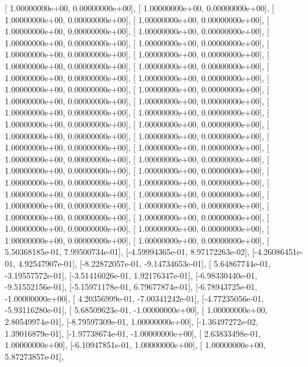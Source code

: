 \documentclass{article}
\begin{document}
       [ 1.00000000e+00,  0.00000000e+00],
       [ 1.00000000e+00,  0.00000000e+00],
       [ 1.00000000e+00,  0.00000000e+00],
       [ 1.00000000e+00,  0.00000000e+00],
       [ 1.00000000e+00,  0.00000000e+00],
       [ 1.00000000e+00,  0.00000000e+00],
       [ 1.00000000e+00,  0.00000000e+00],
       [ 1.00000000e+00,  0.00000000e+00],
       [ 1.00000000e+00,  0.00000000e+00],
       [ 1.00000000e+00,  0.00000000e+00],
       [ 1.00000000e+00,  0.00000000e+00],
       [ 1.00000000e+00,  0.00000000e+00],
       [ 1.00000000e+00,  0.00000000e+00],
       [ 1.00000000e+00,  0.00000000e+00],
       [ 1.00000000e+00,  0.00000000e+00],
       [ 1.00000000e+00,  0.00000000e+00],
       [ 1.00000000e+00,  0.00000000e+00],
       [ 1.00000000e+00,  0.00000000e+00],
       [ 1.00000000e+00,  0.00000000e+00],
       [ 1.00000000e+00,  0.00000000e+00],
       [ 1.00000000e+00,  0.00000000e+00],
       [ 1.00000000e+00,  0.00000000e+00],
       [ 1.00000000e+00,  0.00000000e+00],
       [ 1.00000000e+00,  0.00000000e+00],
       [ 1.00000000e+00,  0.00000000e+00],
       [ 1.00000000e+00,  0.00000000e+00],
       [ 1.00000000e+00,  0.00000000e+00],
       [ 1.00000000e+00,  0.00000000e+00],
       [ 1.00000000e+00,  0.00000000e+00],
       [ 1.00000000e+00,  0.00000000e+00],
       [ 1.00000000e+00,  0.00000000e+00],
       [ 1.00000000e+00,  0.00000000e+00],
       [ 1.00000000e+00,  0.00000000e+00],
       [ 1.00000000e+00,  0.00000000e+00],
       [ 1.00000000e+00,  0.00000000e+00],
       [ 1.00000000e+00,  0.00000000e+00],
       [ 1.00000000e+00,  0.00000000e+00],
       [ 1.00000000e+00,  0.00000000e+00],
       [ 1.00000000e+00,  0.00000000e+00],
       [ 1.00000000e+00,  0.00000000e+00],
       [ 1.00000000e+00,  0.00000000e+00],
       [ 1.00000000e+00,  0.00000000e+00],
       [ 5.50368185e-01,  7.99500734e-01],
       [-4.59994365e-01,  8.97172263e-02],
       [-4.26086451e-01,  4.92547907e-01],
       [-8.22872057e-01, -9.14734653e-01],
       [ 5.64867744e-01, -3.19557572e-01],
       [-3.51416026e-01,  1.92176347e-01],
       [-6.98330440e-01, -9.51552156e-01],
       [-5.15971178e-01,  6.79677874e-01],
       [-6.78943725e-01, -1.00000000e+00],
       [ 4.20356999e-01, -7.00341242e-01],
       [-4.77235056e-01, -5.93116280e-01],
       [ 5.68509623e-01, -1.00000000e+00],
       [ 1.00000000e+00,  2.80549974e-01],
       [-8.79597309e-01,  1.00000000e+00],
       [-1.36497272e-02,  1.39016879e-01],
       [-1.97738674e-01, -1.00000000e+00],
       [ 2.63833498e-01,  1.00000000e+00],
       [-6.10947851e-01,  1.00000000e+00],
       [ 1.00000000e+00,  5.87273857e-01],
\end{document}
